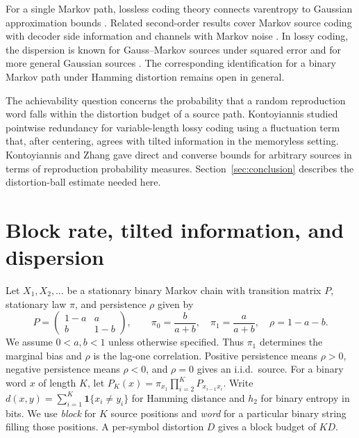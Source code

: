 \documentclass[11pt,letterpaper]{article}
\theoremstyle{definition}
\newcommand{\ind}{\mathbf 1}
\newcommand{\hx}{h_2}
\begin{document}
For a single Markov path, lossless coding theory connects varentropy to Gaussian approximation bounds \cite{kontoverdu}. Related second-order results cover Markov source coding with decoder side information and channels with Markov noise \cite{hayashi}. In lossy coding, the dispersion is known for Gauss--Markov sources under squared error and for more general Gaussian sources \cite{tian,tasci}. The corresponding identification for a binary Markov path under Hamming distortion remains open in general.

The achievability question concerns the probability that a random reproduction word falls within the distortion budget of a source path. Kontoyiannis \cite{konto00} studied pointwise redundancy for variable-length lossy coding using a fluctuation term that, after centering, agrees with tilted information in the memoryless setting. Kontoyiannis and Zhang \cite{kz02} gave direct and converse bounds for arbitrary sources in terms of reproduction probability measures. Section~\ref{sec:conclusion} describes the distortion-ball estimate needed here.

\section{Block rate, tilted information, and dispersion}\label{sec:setup}
Let $X_1,X_2,\ldots$ be a stationary binary Markov chain with transition matrix $P$, stationary law $\pi$, and persistence $\rho$ given by
\[
 P=\begin{pmatrix}1-a&a\\ b&1-b\end{pmatrix},\qquad
 \pi_0=\frac b{a+b},\quad \pi_1=\frac a{a+b},\quad \rho=1-a-b .
\]
We assume $0<a,b<1$ unless otherwise specified. Thus $\pi_1$ determines the marginal bias and $\rho$ is the lag-one correlation. Positive persistence means $\rho>0$, negative persistence means $\rho<0$, and $\rho=0$ gives an i.i.d.\ source. For a binary word $x$ of length $K$, let $P_K(x)=\pi_{x_1}\prod_{i=2}^K P_{x_{i-1}x_i}$. Write $d(x,y)=\sum_{i=1}^K\ind\{x_i\ne y_i\}$ for Hamming distance and $\hx$ for binary entropy in bits. We use \emph{block} for $K$ source positions and \emph{word} for a particular binary string filling those positions. A per-symbol distortion $D$ gives a block budget of $KD$.
\end{document}
